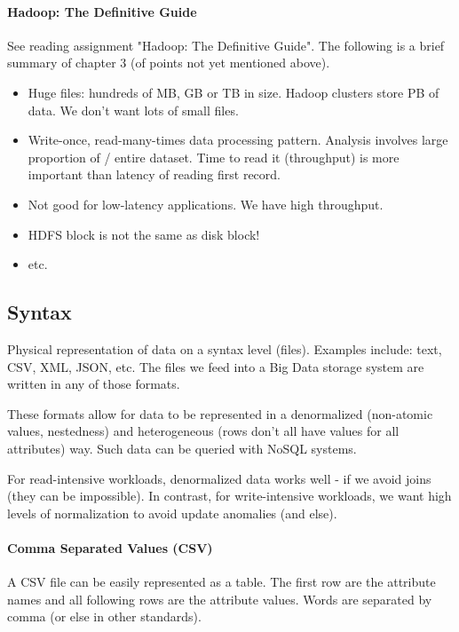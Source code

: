 
\paragraph{Hadoop: The Definitive Guide}
See reading assignment "Hadoop: The Definitive Guide". The following is a brief summary of chapter 3 (of points not yet mentioned above).

\begin{itemize}
    \item Huge files: hundreds of MB, GB or TB in size. Hadoop clusters store PB of data. We don't want lots of small files.
    \item Write-once, read-many-times data processing pattern. Analysis involves large proportion of / entire dataset. Time to read it (throughput) is more important than latency of reading first record.
    \item Not good for low-latency applications. We have high throughput.
    \item HDFS block is not the same as disk block!
    \item etc.
\end{itemize}




\subsection{Syntax}

Physical representation of data on a syntax level (files). Examples include: text, CSV, XML, JSON, etc. The files we feed into a Big Data storage system are written in any of those formats.

These formats allow for data to be represented in a denormalized (non-atomic values, nestedness) and heterogeneous (rows don't all have values for all attributes) way. Such data can be queried with NoSQL systems.

For read-intensive workloads, denormalized data works well - if we avoid joins (they can be impossible). In contrast, for write-intensive workloads, we want high levels of normalization to avoid update anomalies (and else).

\paragraph{Comma Separated Values (CSV)}
A CSV file can be easily represented as a table. The first row are the attribute names and all following rows are the attribute values. Words are separated by comma (or else in other standards).

